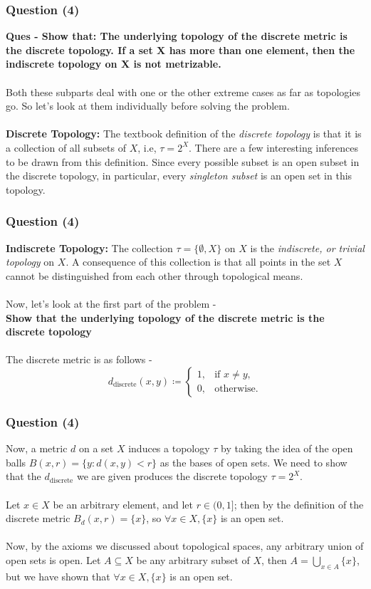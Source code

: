 
\begin{frame}
    \frametitle{Question (4)}
    \textbf{Ques - Show that: The underlying topology of the discrete metric is the discrete topology. If a set X has more than one element, then the indiscrete topology on X is not metrizable.}\\\\
    Both these subparts deal with one or the other extreme cases as far as topologies go. So let's look at them individually before solving the problem.\\\\
    \textbf{Discrete Topology:} The textbook definition of the \textit{discrete topology} is that it is a collection of all subsets of $X$, i.e, $\tau = 2^{X}$. There are a few interesting inferences to be drawn from this definition. Since every possible subset is an open subset in the discrete topology, in particular, every \textit{singleton subset} is an open set in this topology.
\end{frame}

\begin{frame}
    \frametitle{Question (4)}
    \textbf{Indiscrete Topology:} The collection $\tau = \{ \emptyset , X \}$ on $X$ is the \textit{indiscrete, or trivial topology} on $X$. A consequence of this collection is that all points in the set $X$ cannot be distinguished from each other through topological means.\\\\
    Now, let's look at the first part of the problem - \\
    \textbf{Show that the underlying topology of the discrete metric is the discrete topology} \\\\
    The discrete metric is as follows - \\
    \[
        d_{\text{discrete}}(x,y) \coloneqq 
        \begin{cases}
            1, & \text{if } x \neq y, \\
            0, & \text{otherwise}.
        \end{cases}
    \]
\end{frame}

\begin{frame}
    \frametitle{Question (4)}
    Now, a metric $d$ on a set $X$ induces a topology $\tau$ by taking the idea of the open balls $B(x,r) = \{y : d(x,y) < r\}$ as the bases of open sets. We need to show that the $d_{\text{discrete}}$ we are given produces the discrete topology $\tau = 2^{X}$.\\\\
    Let $x \in X$ be an arbitrary element, and let $r \in (0, 1]$; then by the definition of the discrete metric $B_d(x,r) = \{x\}$, so $\forall x \in X, \{x\}$ is an open set.\\\\
    Now, by the axioms we discussed about topological spaces, any arbitrary union of open sets is open. Let $A \subseteq X$ be any arbitrary subset of $X$, then $A = \bigcup_{x \in A} \{x\}$, but we have shown that $\forall x \in X, \{x\}$ is an open set.
\end{frame}


